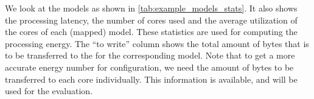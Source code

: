 
We look at the models as shown in \cref{tab:example_models_stats}.
It also shows the processing latency, the number of cores used and the average utilization of the cores of each (mapped) model.
These statistics are used for computing the processing energy.
The ``to write'' column shows the total amount of bytes that is to be transferred to the \graicore{} for the corresponding model.
Note that to get a more accurate energy number for configuration, we need the amount of bytes to be transferred to each core individually.
This information is available, and will be used for the evaluation.

